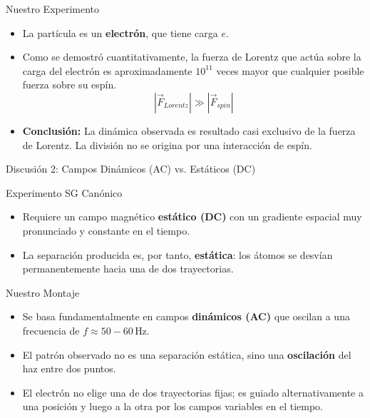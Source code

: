 \documentclass{beamer}
\begin{document}
\begin{frame}

  \begin{block}{Nuestro Experimento}
    \begin{itemize}
      \item La partícula es un \textbf{electrón}, que tiene carga $e$.
      \item Como se demostró cuantitativamente, la fuerza de Lorentz que actúa sobre la carga del electrón es aproximadamente $10^{11}$ veces mayor que cualquier posible fuerza sobre su espín.
        $$ |\vec{F}_{Lorentz}| \gg |\vec{F}_{spin}| $$
      \item \textbf{Conclusión:} La dinámica observada es resultado casi exclusivo de la fuerza de Lorentz. La división no se origina por una interacción de espín.
    \end{itemize}
  \end{block}
\end{frame}

\begin{frame}{Discusión 2: Campos Dinámicos (AC) vs. Estáticos (DC)}
  \begin{block}{Experimento SG Canónico}
    \begin{itemize}
      \item Requiere un campo magnético \textbf{estático (DC)} con un gradiente espacial muy pronunciado y constante en el tiempo.
      \item La separación producida es, por tanto, \textbf{estática}: los átomos se desvían permanentemente hacia una de dos trayectorias.
    \end{itemize}
  \end{block}

\end{frame}


\begin{frame}

  \begin{block}{Nuestro Montaje}
    \begin{itemize}
      \item Se basa fundamentalmente en campos \textbf{dinámicos (AC)} que oscilan a una frecuencia de $f \approx 50-60 \, \text{Hz}$.
      \item El patrón observado no es una separación estática, sino una \textbf{oscilación} del haz entre dos puntos.
      \item El electrón no elige una de dos trayectorias fijas; es guiado alternativamente a una posición y luego a la otra por los campos variables en el tiempo.
    \end{itemize}
  \end{block}
\end{frame}
\end{document}
